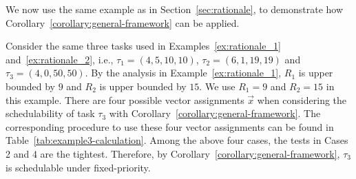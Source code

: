  We now use the same example as in Section~\ref{sec:rationale}, to demonstrate how
Corollary~\ref{corollary:general-framework} can be applied.
 
 \begin{example}
 \label{ex:general_framework}
  Consider the same three tasks used in Examples~\ref{ex:rationale_1} and~\ref{ex:rationale_2}, i.e., $\tau_1 = (4, 5, 10, 10)$, $\tau_2 =(6, 1, 19, 19)$ and $\tau_3 = (4, 0, 50, 50)$. By the analysis in Example~\ref{ex:rationale_1}, $R_1$ is upper bounded by $9$ and $R_2$ is upper bounded by $15$. We use $R_1=9$ and $R_2=15$ in this example. There are four possible vector assignments $\vec{x}$ when considering the schedulability of task $\tau_3$ with Corollary~\ref{corollary:general-framework}.
%
%       
%
%
%
The corresponding procedure to use these four vector assignments can be found in Table~\ref{tab:example3-calculation}. 
Among the above four cases, the tests in Cases 2 and 4 are the tightest. Therefore, by
 Corollary~\ref{corollary:general-framework}, $\tau_3$ is
 schedulable under fixed-priority.
\hfill\myendproof
 \end{example}


